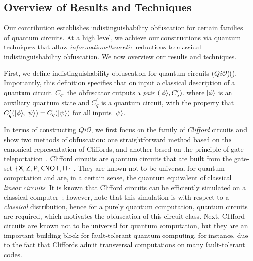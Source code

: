 \subsection{Overview of Results and Techniques}
\label{sec:techniques}

Our contribution establishes indistinguishability obfuscation for certain families of quantum circuits.  At a high level, we achieve our constructions via quantum techniques that allow \emph{information-theoretic} reductions to classical indistinguishability obfuscation. We now overview our results and techniques.


First, we define indistinguishability obfuscation for quantum circuits ($Qi\mathcal{O}$)(). Importantly, this definition specifies that on input a classical description of a quantum circuit~$C_q$, the obfuscator outputs a \emph{pair} $({\lvert}\phi\rangle, C_q^\prime)$, where ${\lvert}\phi\rangle$ is an auxiliary quantum state and $C_q^\prime$ is a quantum circuit, with the property that
$C_q^\prime({\lvert}\phi\rangle,{\lvert}\psi\rangle)=C_{q}({\lvert}\psi\rangle)$ for all inputs ${\lvert}\psi\rangle$.
 
In terms of constructing $Qi\mathcal{O}$, we first focus on the family of \emph{Clifford} circuits and show two methods of obfuscation: one straightforward method based on the canonical representation of Cliffords, and another based on the
principle of gate teleportation~\cite{GC99}.
Clifford circuits are quantum circuits that are built from the gate-set $\{{\sf X}, {\sf Z}, {\sf P}, {\sf CNOT}, {\sf H}\}$ . They are known not to be universal for quantum computation and  are, in a certain sense, the quantum equivalent of classical \emph{linear circuits}. It is known that Clifford circuits can be efficiently simulated on a classical computer~\cite{Got98}; however, note that  this simulation is with respect to a \emph{classical} distribution, hence for a purely quantum computation, quantum circuits are required, which motivates the obfuscation of this circuit class. Next,  Clifford circuits are known not to be universal for quantum computation, but they are an important building block for fault-tolerant quantum computing, for instance, due to the fact that Cliffords admit transversal computations on many fault-tolerant codes.


